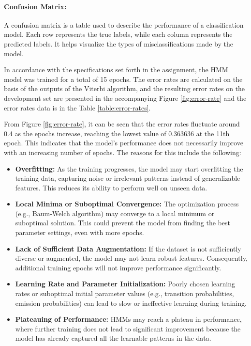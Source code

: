 \documentclass{article}
\begin{document}
\paragraph{Confusion Matrix:} A confusion matrix is a table used to describe the performance of a classification model. Each row represents the true labels, while each column represents the predicted labels. It helps visualize the types of misclassifications made by the model.

In accordance with the specifications set forth in the assignment, the HMM model was trained for a total of 15 epochs. The error rates are calculated on the basis of the outputs of the Viterbi algorithm, and the resulting error rates on the development set are presented in the accompanying Figure \ref{fig:error-rate} and the error rates data is in the Table \ref{table:error-rates}.

From Figure \ref{fig:error-rate}, it can be seen that the error rates fluctuate around 0.4 as the epochs increase, reaching the lowest value of 0.363636 at the 11th epoch. This indicates that the model’s performance does not necessarily improve with an increasing number of epochs. The reasons for this include the following:

\begin{itemize}
	\item \textbf{Overfitting:} As the training progresses, the model may start overfitting the training data, capturing noise or irrelevant patterns instead of generalizable features. This reduces its ability to perform well on unseen data.
	\item \textbf{Local Minima or Suboptimal Convergence:} The optimization process (e.g., Baum-Welch algorithm) may converge to a local minimum or suboptimal solution. This could prevent the model from finding the best parameter settings, even with more epochs.
	\item \textbf{Lack of Sufficient Data Augmentation:} If the dataset is not sufficiently diverse or augmented, the model may not learn robust features. Consequently, additional training epochs will not improve performance significantly.
	\item \textbf{Learning Rate and Parameter Initialization:} Poorly chosen learning rates or suboptimal initial parameter values (e.g., transition probabilities, emission probabilities) can lead to slow or ineffective learning during training.
	\item \textbf{Plateauing of Performance:} HMMs may reach a plateau in performance, where further training does not lead to significant improvement because the model has already captured all the learnable patterns in the data.
\end{itemize}
\end{document}
